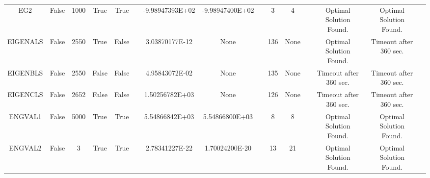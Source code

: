 \begin{longtable}{ccccccccccccccc}
	\cellcolor{default2} EG2& \cellcolor{default2} False& \cellcolor{default2} 1000& \cellcolor{default2} True& \cellcolor{default2} True& \cellcolor{header} & \cellcolor{ok} -9.98947393E+02& \cellcolor{best} -9.98947400E+02& \cellcolor{header} & \cellcolor{best} 3& \cellcolor{ok} 4& \cellcolor{header} & \cellcolor{default2} Optimal Solution Found.& \cellcolor{default2} Optimal Solution Found.& \cellcolor{header} \\
	\cellcolor{default1} EIGENALS& \cellcolor{default1} False& \cellcolor{default1} 2550& \cellcolor{default1} True& \cellcolor{default1} False& \cellcolor{header} & \cellcolor{best} 3.03870177E-12& \cellcolor{err} None& \cellcolor{header} & \cellcolor{best} 136& \cellcolor{err} None& \cellcolor{header} & \cellcolor{default1} Optimal Solution Found.& \cellcolor{default1} Timeout after 360 sec.& \cellcolor{header} \\
	\cellcolor{default2} EIGENBLS& \cellcolor{default2} False& \cellcolor{default2} 2550& \cellcolor{default2} False& \cellcolor{default2} False& \cellcolor{header} & \cellcolor{best} 4.95843072E-02& \cellcolor{err} None& \cellcolor{header} & \cellcolor{best} 135& \cellcolor{err} None& \cellcolor{header} & \cellcolor{default2} Timeout after 360 sec.& \cellcolor{default2} Timeout after 360 sec.& \cellcolor{header} \\
	\cellcolor{default1} EIGENCLS& \cellcolor{default1} False& \cellcolor{default1} 2652& \cellcolor{default1} False& \cellcolor{default1} False& \cellcolor{header} & \cellcolor{best} 1.50256782E+03& \cellcolor{err} None& \cellcolor{header} & \cellcolor{best} 126& \cellcolor{err} None& \cellcolor{header} & \cellcolor{default1} Timeout after 360 sec.& \cellcolor{default1} Timeout after 360 sec.& \cellcolor{header} \\
	\cellcolor{default2} ENGVAL1& \cellcolor{default2} False& \cellcolor{default2} 5000& \cellcolor{default2} True& \cellcolor{default2} True& \cellcolor{header} & \cellcolor{ok} 5.54866842E+03& \cellcolor{best} 5.54866800E+03& \cellcolor{header} & \cellcolor{best} 8& \cellcolor{best} 8& \cellcolor{header} & \cellcolor{default2} Optimal Solution Found.& \cellcolor{default2} Optimal Solution Found.& \cellcolor{header} \\
	\cellcolor{default1} ENGVAL2& \cellcolor{default1} False& \cellcolor{default1} 3& \cellcolor{default1} True& \cellcolor{default1} True& \cellcolor{header} & \cellcolor{best} 2.78341227E-22& \cellcolor{ok} 1.70024200E-20& \cellcolor{header} & \cellcolor{best} 13& \cellcolor{ok} 21& \cellcolor{header} & \cellcolor{default1} Optimal Solution Found.& \cellcolor{default1} Optimal Solution Found.& \cellcolor{header} \\

\end{longtable}
